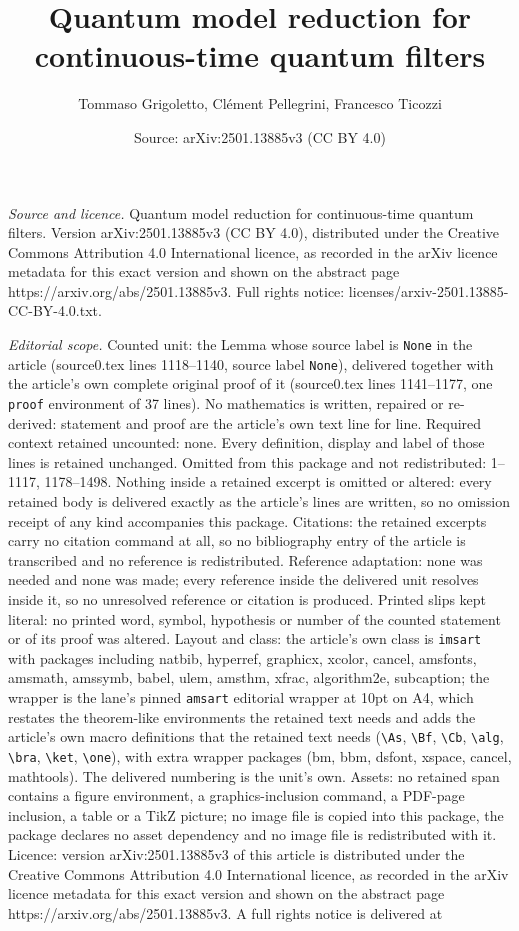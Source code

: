 \documentclass[10pt,a4paper]{amsart}
\title[Quantum model reduction for continuous-time quantum filters]{Quantum model reduction for continuous-time quantum filters}
\author{Tommaso Grigoletto, Cl\'ement Pellegrini, Francesco Ticozzi}
\date{Source: arXiv:2501.13885v3 (CC BY 4.0)}
\begin{document}
\maketitle

\noindent\emph{Source and licence.} Quantum model reduction for continuous-time quantum filters. Version arXiv:2501.13885v3 (CC BY 4.0), distributed under the Creative Commons Attribution 4.0 International licence, as recorded in the arXiv licence metadata for this exact version and shown on the abstract page https://arxiv.org/abs/2501.13885v3. Full rights notice: licenses/arxiv-2501.13885-CC-BY-4.0.txt.\par\smallskip

\noindent\textit{Editorial scope.} Counted unit: the Lemma whose source label is \texttt{None} in the article (source0.tex lines 1118--1140, source label \texttt{None}), delivered together with the article's own complete original proof of it (source0.tex lines 1141--1177, one \texttt{proof} environment of 37 lines). No mathematics is written, repaired or re-derived: statement and proof are the article's own text line for line. Required context retained uncounted: none. Every definition, display and label of those lines is retained unchanged. Omitted from this package and not redistributed: 1--1117, 1178--1498. Nothing inside a retained excerpt is omitted or altered: every retained body is delivered exactly as the article's lines are written, so no omission receipt of any kind accompanies this package. Citations: the retained excerpts carry no citation command at all, so no bibliography entry of the article is transcribed and no reference is redistributed. Reference adaptation: none was needed and none was made; every reference inside the delivered unit resolves inside it, so no unresolved reference or citation is produced. Printed slips kept literal: no printed word, symbol, hypothesis or number of the counted statement or of its proof was altered. Layout and class: the article's own class is \texttt{imsart} with packages including natbib, hyperref, graphicx, xcolor, cancel, amsfonts, amsmath, amssymb, babel, ulem, amsthm, xfrac, algorithm2e, subcaption; the wrapper is the lane's pinned \texttt{amsart} editorial wrapper at 10pt on A4, which restates the theorem-like environments the retained text needs and adds the article's own macro definitions that the retained text needs (\texttt{\textbackslash As}, \texttt{\textbackslash Bf}, \texttt{\textbackslash Cb}, \texttt{\textbackslash alg}, \texttt{\textbackslash bra}, \texttt{\textbackslash ket}, \texttt{\textbackslash one}), with extra wrapper packages (bm, bbm, dsfont, xspace, cancel, mathtools). The delivered numbering is the unit's own. Assets: no retained span contains a figure environment, a graphics-inclusion command, a PDF-page inclusion, a table or a TikZ picture; no image file is copied into this package, the package declares no asset dependency and no image file is redistributed with it. Licence: version arXiv:2501.13885v3 of this article is distributed under the Creative Commons Attribution 4.0 International licence, as recorded in the arXiv licence metadata for this exact version and shown on the abstract page https://arxiv.org/abs/2501.13885v3. A full rights notice is delivered at 
\end{document}
